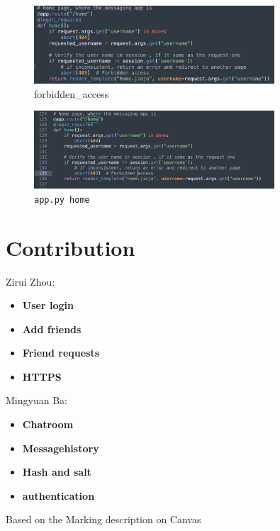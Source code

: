 \documentclass[12pt]{article}
\begin{document}
        \begin{figure}[H]
            \centering
            \includegraphics[width=0.8\textwidth]{graphs/forbidden_access.jpg}
            \caption{forbidden\_access}
            \label{forbidden access}{}
        \end{figure}


        \begin{figure}[H]
            \centering
            \includegraphics[width=0.8\textwidth]{graphs/home_session.jpg}
            \caption{\texttt{app.py home}}
            \label{home session}
        \end{figure}

\section{Contribution}

 Zirui Zhou:  
\begin{itemize}
\item \textbf{User login}
\item \textbf{Add friends}
\item \textbf{Friend requests}
\item \textbf{HTTPS}
\end{itemize}

\noindent Mingyuan Ba:
\begin{itemize}
\item \textbf{Chatroom}
\item \textbf{Messagehistory}
\item \textbf{Hash and salt}
\item \textbf{authentication}
\end{itemize}

Based on the Marking description on Canvas

       

 
\end{document}
